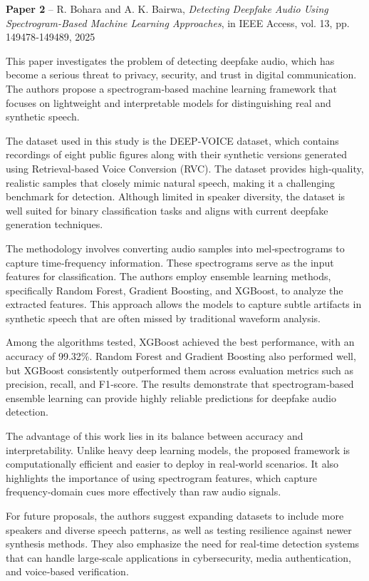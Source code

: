 \documentclass[12pt,a4paper]{report}
\begin{document}

\textbf{Paper 2} – R. Bohara and A. K. Bairwa, \textit{Detecting Deepfake Audio Using Spectrogram-Based Machine Learning Approaches}, in IEEE Access, vol. 13, pp. 149478‑149489, 2025

This paper investigates the problem of detecting deepfake audio, which has become a serious threat to privacy, security, and trust in digital communication. The authors propose a spectrogram‑based machine learning framework that focuses on lightweight and interpretable models for distinguishing real and synthetic speech.

The dataset used in this study is the DEEP‑VOICE dataset, which contains recordings of eight public figures along with their synthetic versions generated using Retrieval‑based Voice Conversion (RVC). The dataset provides high‑quality, realistic samples that closely mimic natural speech, making it a challenging benchmark for detection. Although limited in speaker diversity, the dataset is well suited for binary classification tasks and aligns with current deepfake generation techniques.

The methodology involves converting audio samples into mel‑spectrograms to capture time‑frequency information. These spectrograms serve as the input features for classification. The authors employ ensemble learning methods, specifically Random Forest, Gradient Boosting, and XGBoost, to analyze the extracted features. This approach allows the models to capture subtle artifacts in synthetic speech that are often missed by traditional waveform analysis.

Among the algorithms tested, XGBoost achieved the best performance, with an accuracy of 99.32\%. Random Forest and Gradient Boosting also performed well, but XGBoost consistently outperformed them across evaluation metrics such as precision, recall, and F1‑score. The results demonstrate that spectrogram‑based ensemble learning can provide highly reliable predictions for deepfake audio detection.

The advantage of this work lies in its balance between accuracy and interpretability. Unlike heavy deep learning models, the proposed framework is computationally efficient and easier to deploy in real‑world scenarios. It also highlights the importance of using spectrogram features, which capture frequency‑domain cues more effectively than raw audio signals.

For future proposals, the authors suggest expanding datasets to include more speakers and diverse speech patterns, as well as testing resilience against newer synthesis methods. They also emphasize the need for real‑time detection systems that can handle large‑scale applications in cybersecurity, media authentication, and voice‑based verification.
\end{document}
